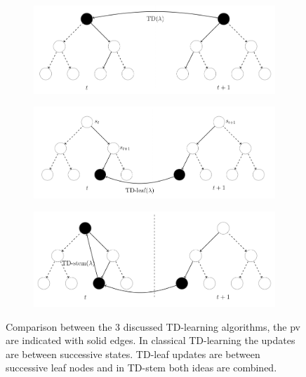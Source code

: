 \documentclass[twocolumn]{phdsymp} %
\begin{document}
\begin{figure}
    \centering
    \begin{subfigure}{0.4\textwidth}
        \includegraphics[scale=0.25]{tdlambda}
    \end{subfigure}
    \begin{subfigure}{0.4\textwidth}
        \includegraphics[trim={0.25cm 0cm 0 0cm},clip,scale=0.25]{tdl}
    \end{subfigure}
    \begin{subfigure}{0.4\textwidth}
        \includegraphics[trim={0cm 0cm 0.5cm 0cm},clip,scale=0.25]{tds}
    \end{subfigure}
    \caption{Comparison between the 3 discussed TD-learning algorithms, the \Gls{pv} are indicated with solid edges. In classical TD-learning the updates are between successive states. TD-leaf updates are between successive leaf nodes and in TD-stem both ideas are combined. }\label{fig:algs}
\end{figure}
\end{document}
